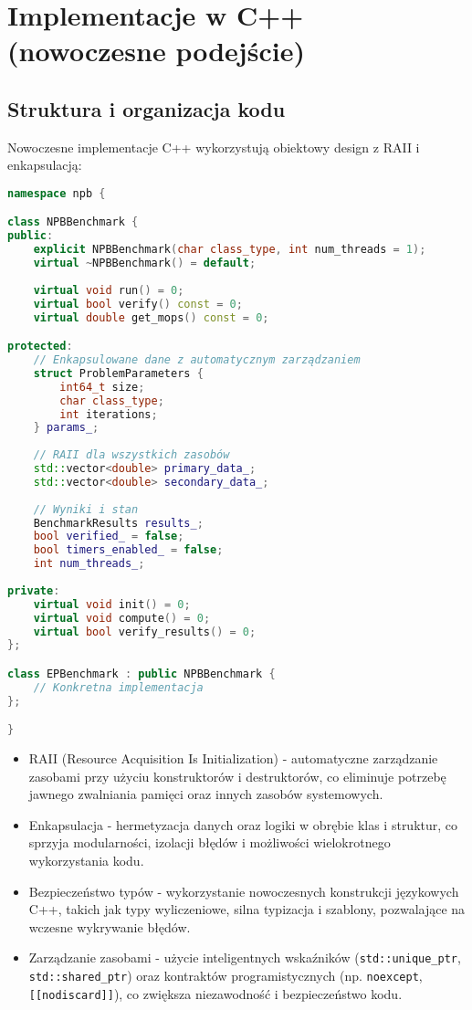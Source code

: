 \section{Implementacje w C++ (nowoczesne podejście)}
\subsection{Struktura i organizacja kodu}
Nowoczesne implementacje C++ wykorzystują obiektowy design z RAII i enkapsulacją:
\begin{lstlisting}[language=C++, caption={Implementacja nowoczesnego C++ - struktura kodu}, label={lst:modern-cpp-structure}]
namespace npb {

class NPBBenchmark {
public:
    explicit NPBBenchmark(char class_type, int num_threads = 1);
    virtual ~NPBBenchmark() = default;
    
    virtual void run() = 0;
    virtual bool verify() const = 0;
    virtual double get_mops() const = 0;

protected:
    // Enkapsulowane dane z automatycznym zarządzaniem
    struct ProblemParameters {
        int64_t size;
        char class_type;
        int iterations;
    } params_;
    
    // RAII dla wszystkich zasobów
    std::vector<double> primary_data_;
    std::vector<double> secondary_data_;
    
    // Wyniki i stan
    BenchmarkResults results_;
    bool verified_ = false;
    bool timers_enabled_ = false;
    int num_threads_;
    
private:
    virtual void init() = 0;
    virtual void compute() = 0;
    virtual bool verify_results() = 0;
};

class EPBenchmark : public NPBBenchmark {
    // Konkretna implementacja
};

}
\end{lstlisting}
\begin{itemize}
    \item RAII (Resource Acquisition Is Initialization) - automatyczne zarządzanie zasobami przy użyciu konstruktorów i destruktorów, co eliminuje potrzebę jawnego zwalniania pamięci oraz innych zasobów systemowych.
    
    \item Enkapsulacja - hermetyzacja danych oraz logiki w obrębie klas i struktur, co sprzyja modularności, izolacji błędów i możliwości wielokrotnego wykorzystania kodu.
    
    \item Bezpieczeństwo typów - wykorzystanie nowoczesnych konstrukcji językowych C++, takich jak typy wyliczeniowe, silna typizacja i szablony, pozwalające na wczesne wykrywanie błędów.
    
    \item Zarządzanie zasobami - użycie inteligentnych wskaźników (\texttt{std::unique\_ptr}, \texttt{std::shared\_ptr}) oraz kontraktów programistycznych (np. \texttt{noexcept}, \texttt{[[nodiscard]]}), co zwiększa niezawodność i bezpieczeństwo kodu.
\end{itemize}

